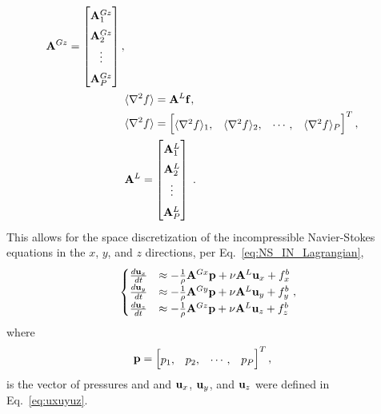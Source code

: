 \begin{align}
\mathbf{A}^{Gz}= \begin{bmatrix}
\mathbf{A}^{Gz}_1\\\mathbf{A}^{Gz}_2\\\vdots\\\mathbf{A}^{Gz}_{\nParticles}
\end{bmatrix},\\
&\langle \nabla^2 f \rangle=\mathbf{A}^L\mathbf{f},\label{eq:laplace_op}\\
&\langle \nabla^2 f \rangle= \begin{bmatrix}
\langle \nabla^2 f \rangle_1,&\langle \nabla^2 f \rangle_2,&\cdots,&\langle \nabla^2 f \rangle_{\nParticles}
\end{bmatrix}^T,\\
&\mathbf{A}^L=  \renewcommand*{\arraystretch}{1.5}
\begin{bmatrix}
\mathbf{A}^L_1\\\mathbf{A}^L_2\\\vdots\\\mathbf{A}^L_{\nParticles}
\end{bmatrix} \; .
\end{align}
This allows for the space discretization of the incompressible Navier-Stokes equations in the $x$, $y$, and $z$ directions, per Eq.~\ref{eq:NS_IN_Lagrangian},
\begin{align}
\begin{cases}
\frac{d{\bf u}_x}{dt} & \approx -\frac{1}{\rho} \mathbf{A}^{Gx}\mathbf{p} + \nu \mathbf{A}^L{\bf u}_x+{ f}_x^b\\
\frac{d{\bf u}_y}{dt} & \approx -\frac{1}{\rho} \mathbf{A}^{Gy}\mathbf{p} + \nu \mathbf{A}^L{\bf u}_y+{ f}_y^b\\
\frac{d{\bf u}_z}{dt} & \approx -\frac{1}{\rho} \mathbf{A}^{Gz}\mathbf{p} + \nu \mathbf{A}^L{\bf u}_z+{ f}_z^b
\end{cases}\label{eq:NS_discretized},
\end{align}
where 
\begin{align}
&\mathbf{p}= \begin{bmatrix}
p_{1},&p_{2},&\cdots,&p_{\nParticles}
\end{bmatrix}^T,\label{eq:pres_vec}
\end{align} 
is the vector of pressures and 
and ${\bf u}_x$, ${\bf u}_y$, and ${\bf u}_z$ were defined in Eq.~\ref{eq:uxuyuz}.


